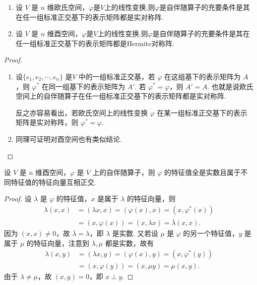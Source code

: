 \documentclass[../../main.tex]{subfiles}
\begin{document}
\begin{theorem}\label{theorem:内积空间的自伴随算子关于表示矩阵的充要条件}
\begin{enumerate}
\item 设 $V$ 是 $n$ 维欧氏空间，$\varphi$是$V$上的线性变换,则$\varphi$是自伴随算子的充要条件是其在任一组标准正交基下的表示矩阵都是实对称阵.

\item 设 $V$ 是 $n$ 维酉空间，$\varphi$是$V$上的线性变换,则$\varphi$是自伴随算子的充要条件是其在任一组标准正交基下的表示矩阵都是Hermite对称阵. 
\end{enumerate}
\end{theorem}
\begin{proof}
\begin{enumerate}
\item 设$\{e_1,e_2,\cdots,e_n\}$ 是$V$ 中的一组标准正交基，若 $\varphi$ 在这组基下的表示矩阵为 $A$，则 $\varphi^*$ 在同一组基下的表示矩阵为 $A'$. 若 $\varphi^* = \varphi$，则 $A' = A$. 也就是说欧氏空间上的自伴随算子在任一组标准正交基下的表示矩阵都是实对称阵.

反之亦容易看出，若欧氏空间上的线性变换 $\varphi$ 在某一组标准正交基下的表示矩阵是实对称阵，则 $\varphi^* = \varphi$.

\item 同理可证明对酉空间也有类似结论. 
\end{enumerate}

\end{proof}

\begin{theorem}\label{theorem:Hermite算子关于特征值的相关性质}
设 $V$ 是 $n$ 维酉空间，$\varphi$ 是 $V$ 上的自伴随算子，则 $\varphi$ 的特征值全是实数且属于不同特征值的特征向量互相正交.
\end{theorem}
\begin{proof}
设 $\lambda$ 是 $\varphi$ 的特征值，$x$ 是属于 $\lambda$ 的特征向量，则
\begin{align*}
\lambda(x,x) &= (\lambda x,x) = (\varphi(x),x) = (x,\varphi^*(x))\\
&= (x,\varphi(x)) = (x,\lambda x) = \overline{\lambda}(x,x).
\end{align*}
因为 $(x,x) \neq 0$，故 $\overline{\lambda} = \lambda$，即 $\lambda$ 是实数. 又若设 $\mu$ 是 $\varphi$ 的另一个特征值，$y$ 是属于 $\mu$ 的特征向量，注意到 $\lambda,\mu$ 都是实数，故有
\begin{align*}
\lambda(x,y) &= (\lambda x,y) = (\varphi(x),y) = (x,\varphi^*(y))\\
&= (x,\varphi(y)) = (x,\mu y) = \mu(x,y).
\end{align*}
由于 $\lambda \neq \mu$，故 $(x,y) = 0$，即 $x \perp y$.

\end{proof}
\end{document}
